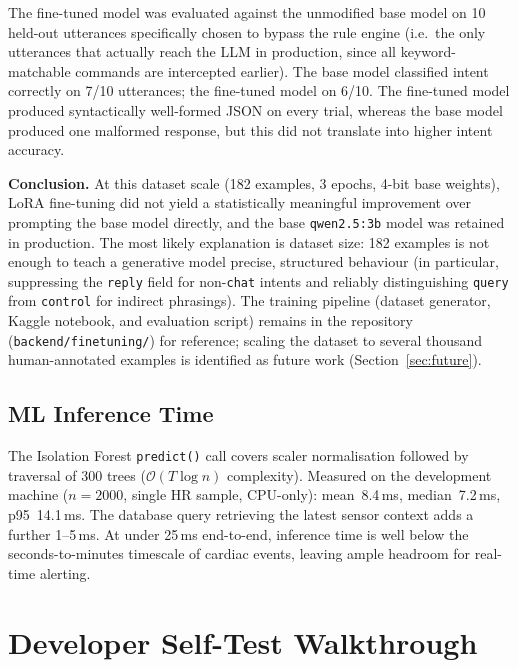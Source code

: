 The fine-tuned model was evaluated against the unmodified base model on 10 held-out utterances specifically chosen to bypass the rule engine (i.e.\ the only utterances that actually reach the LLM in production, since all keyword-matchable commands are intercepted earlier). The base model classified intent correctly on 7/10 utterances; the fine-tuned model on 6/10. The fine-tuned model produced syntactically well-formed JSON on every trial, whereas the base model produced one malformed response, but this did not translate into higher intent accuracy.

\textbf{Conclusion.} At this dataset scale (182 examples, 3 epochs, 4-bit base weights), LoRA fine-tuning did not yield a statistically meaningful improvement over prompting the base model directly, and the base \texttt{qwen2.5:3b} model was retained in production. The most likely explanation is dataset size: 182 examples is not enough to teach a generative model precise, structured behaviour (in particular, suppressing the \texttt{reply} field for non-\texttt{chat} intents and reliably distinguishing \texttt{query} from \texttt{control} for indirect phrasings). The training pipeline (dataset generator, Kaggle notebook, and evaluation script) remains in the repository (\texttt{backend/finetuning/}) for reference; scaling the dataset to several thousand human-annotated examples is identified as future work (Section~\ref{sec:future}).

\subsection{ML Inference Time}

The Isolation Forest \texttt{predict()} call covers scaler normalisation followed by traversal of 300 trees ($\mathcal{O}(T \log n)$ complexity). Measured on the development machine ($n=2000$, single HR sample, CPU-only): mean~8.4\,ms, median~7.2\,ms, p95~14.1\,ms. The database query retrieving the latest sensor context adds a further 1--5\,ms. At under 25\,ms end-to-end, inference time is well below the seconds-to-minutes timescale of cardiac events, leaving ample headroom for real-time alerting.

\section{Developer Self-Test Walkthrough}
\label{sec:usability}

